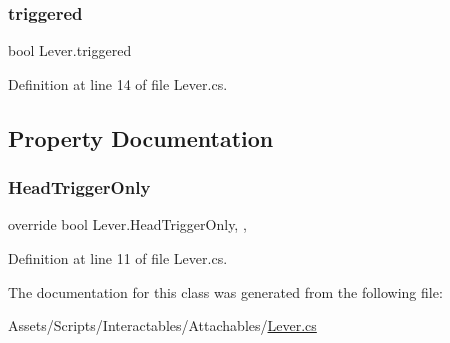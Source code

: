 \subsubsection{\texorpdfstring{triggered}{triggered}}
{\footnotesize\ttfamily bool Lever.\+triggered\hspace{0.3cm}{\ttfamily [protected]}}



Definition at line 14 of file Lever.\+cs.



\subsection{Property Documentation}
\mbox{\label{class_lever_afe56ba98c4cdf20260b7152caab3f3d9}} 
\subsubsection{\texorpdfstring{Head\+Trigger\+Only}{HeadTriggerOnly}}
{\footnotesize\ttfamily override bool Lever.\+Head\+Trigger\+Only\hspace{0.3cm}{\ttfamily [get]}, {\ttfamily [set]}, {\ttfamily [protected]}}



Definition at line 11 of file Lever.\+cs.



The documentation for this class was generated from the following file\+:\begin{DoxyCompactItemize}
\item 
Assets/\+Scripts/\+Interactables/\+Attachables/\mbox{\hyperlink{_lever_8cs}{Lever.\+cs}}\end{DoxyCompactItemize}
